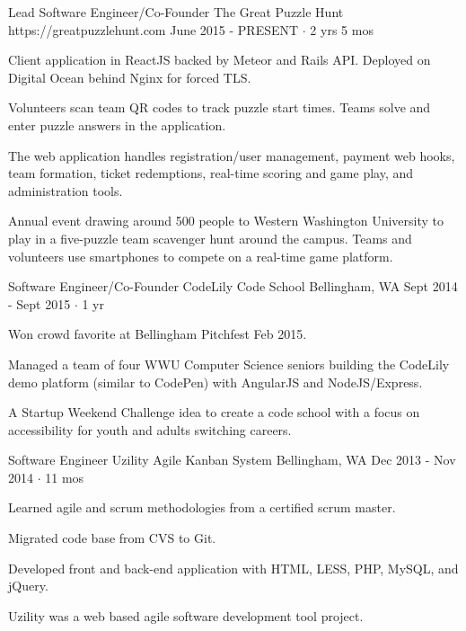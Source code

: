 \documentclass[11pt, a4paper]{awesome-cv}
\begin{document}
\begin{cventries}

  \cventry
    {Lead Software Engineer/Co-Founder} %
    {The Great Puzzle Hunt} %
    {https://greatpuzzlehunt.com} %
    {June 2015 - PRESENT $\cdot$ 2 yrs 5 mos} %
    {
      \begin{cvitems} %
        \item Client application in ReactJS backed by Meteor and Rails API. Deployed on Digital Ocean behind Nginx for forced TLS.
        \item Volunteers scan team QR codes to track puzzle start times. Teams solve and enter puzzle answers in the application.
        \item The web application handles registration/user management, payment web hooks, team formation, ticket redemptions, real-time scoring and game play, and administration tools.
      \end{cvitems}
    }
    {
      Annual event drawing around 500 people to Western Washington University to play in a five-puzzle team scavenger hunt around the campus.
      Teams and volunteers use smartphones to compete on a real-time game platform.
    }

  \cventry
    {Software Engineer/Co-Founder} %
    {CodeLily Code School} %
    {Bellingham, WA} %
    {Sept 2014 - Sept 2015 $\cdot$ 1 yr} %
    {
      \begin{cvitems} %
        \item Won crowd favorite at Bellingham Pitchfest Feb 2015.
        \item Managed a team of four WWU Computer Science seniors building the CodeLily demo platform (similar to CodePen) with AngularJS and NodeJS/Express.
      \end{cvitems}
    }
    {A Startup Weekend Challenge idea to create a code school with a focus on accessibility for youth and adults switching careers.}

  \cventry
    {Software Engineer} %
    {Uzility Agile Kanban System} %
    {Bellingham, WA} %
    {Dec 2013 - Nov 2014 $\cdot$ 11 mos} %
    {
      \begin{cvitems} %
        \item Learned agile and scrum methodologies from a certified scrum master.
        \item Migrated code base from CVS to Git.
        \item Developed front and back-end application with HTML, LESS, PHP, MySQL, and jQuery.
      \end{cvitems}
    }
    {Uzility was a web based agile software development tool project.}
\end{cventries}
\end{document}
